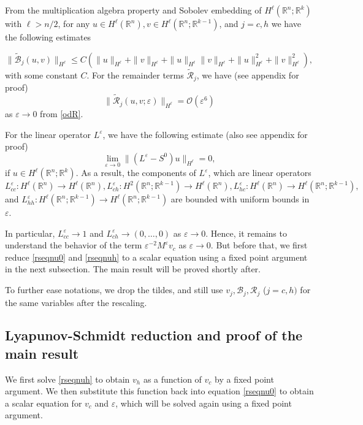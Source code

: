 \documentclass[letterpaper,11pt]{article}
\newcommand{\R}{\mathbb{R}}
\newcommand{\rmO}{\mathcal{O}}
\newcommand{\eps}{\varepsilon}
\newcommand{\B}{\mathcal{B}}
\newcommand{\Rm}{\mathcal{R}}
\numberwithin{equation}{section}
\theoremstyle{plain}
\theoremstyle{remark}
\begin{document}
From the multiplication algebra property and Sobolev embedding of $H^\ell(\R^n;\R^k)$ with $\ell>n/2$, for any $u\in H^\ell(\R^n), v\in H^\ell(\R^n;\R^{k-1})$, and $j=c,h$ we have the following estimates

\begin{equation}\label{Blest}
\|\tilde{\B}_j(u,v)\|_{H^\ell} \le C\left(\|u\|_{H^\ell}+\|v\|_{H^\ell}+\|u\|_{H^\ell}\|v\|_{H^\ell} +\|u\|_{H^\ell}^2+\|v\|^2_{H^\ell}\right),
\end{equation}
with some constant $C$. For the remainder terms $\tilde{\Rm}_j$, we have (see appendix for proof)
\begin{equation}
 \|\tilde{\Rm}_j(u,v;\eps)\|_{H^\ell} = \rmO(\eps^6)  \label{Nlest}
\end{equation}
as $\eps \to 0$ from \eqref{odR}.

 For the linear operator $L^\eps$, we have the following estimate (also see appendix for proof)
\begin{equation}\label{Liest}
\lim_{\eps \to 0} \|(L^\eps - S^0)u \|_{H^\ell} = 0,
\end{equation}
if $u \in H^\ell(\R^n;\R^k)$. As a result, the components of $L^\eps$, which are  linear operators $L^\eps_{cc} : H^\ell(\R^n) \to H^\ell (\R^n), L^\eps_{ch}:H^2(\R^n;\R^{k-1}) \to H^\ell (\R^n), L^\eps_{hc}:H^\ell (\R^n) \to H^\ell(\R^n;\R^{k-1}),$ and $L^\eps_{hh}:H^\ell(\R^n;\R^{k-1}) \to H^\ell(\R^n;\R^{k-1})$ are bounded with uniform bounds in $\eps$.


In particular, $L_{cc}^\eps \to 1$ and $L_{ch}^\eps \to (0,\ldots,0)$ as $\eps \to 0$. Hence, it remains to understand the behavior of the term $\eps^{-2}M^\eps v_c$ as $\eps \to 0$. But before that, we first reduce \eqref{rseqnu0} and \eqref{rseqnuh} to a scalar equation using a fixed point argument in the next subsection. The main result will be proved shortly after.

To further ease notations, we drop the tildes, and still use $v_j,\B_j,\Rm_j$ ($j=c,h)$ for the same variables after the rescaling. 



\subsection{Lyapunov-Schmidt reduction and proof of the main result}
We first solve \eqref{rseqnuh} to obtain $v_h$ as a function of $v_c$ by a fixed point argument. We then substitute this function back into equation \eqref{rseqnu0} to obtain a scalar equation for $v_c$ and $\eps$, which will be solved again using a fixed point argument.
\end{document}
